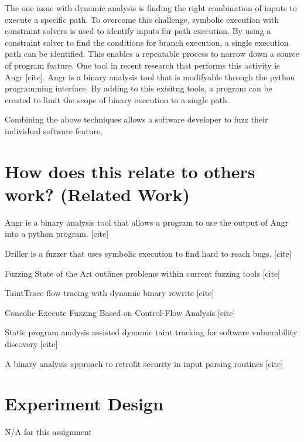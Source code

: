 \documentclass[conference]{IEEEtran}
\begin{document}
The one issue with dynamic analysis is finding the right combination of inputs to execute a specific path. To overcome this challenge, symbolic execution with constraint solvers is used to identify inputs for path execution. By using a constraint solver to find the conditions for branch execution, a single execution path can be identified. This enables a repeatable process to narrow down a source of program feature. One tool in recent research that performs this activity is Angr [cite]. Angr is a binary analysis tool that is modifyable through the python programming interface. By adding to this exisitng tools, a program can be created to limit the scope of binary execution to a single path.

Combining the above techniques allows a software developer to fuzz their individual software feature. 

\section{How does this relate to others work? (Related Work)}
Angr is a binary analysis tool that allows a program to use the output of Angr into a python program. [cite]

Driller is a fuzzer that uses symbolic execution to find hard to reach bugs. [cite]

Fuzzing State of the Art outlines problems within current fuzzing tools [cite]

TaintTrace flow tracing with dynamic binary rewrite [cite]

Concolic Execute Fuzzing Based on Control-Flow Analysis [cite]

Static program analysis assisted dynamic taint tracking for software vulnerability discovery [cite]

A binary analysis approach to retrofit security in input parsing routines [cite]

\section{Experiment Design}
N/A for this assignment
\end{document}
